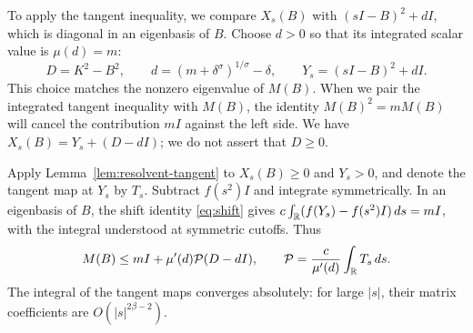 To apply the tangent inequality, we compare $X_s(B)$ with
$(sI-B)^2+dI$, which is diagonal in an eigenbasis of $B$.
Choose $d>0$ so that its integrated scalar value is $\mu(d)=m$:
\begin{equation}\label{eq:D-d-Y}
 D=K^2-B^2,\qquad
 d=(m+\delta^\sigma)^{1/\sigma}-\delta,\qquad
 Y_s=(sI-B)^2+dI.
\end{equation}
This choice matches the nonzero eigenvalue of $M(B)$.
When we pair the integrated tangent inequality with $M(B)$,
the identity $M(B)^2=mM(B)$ will cancel the contribution $mI$
against the left side.
We have $X_s(B)=Y_s+(D-dI)$; we do not assert that $D\ge0$.

Apply Lemma~\ref{lem:resolvent-tangent} to $X_s(B)\ge0$ and $Y_s>0$,
and denote the tangent map at $Y_s$ by $T_s$.
Subtract $f(s^2)I$ and integrate symmetrically.
In an eigenbasis of $B$, the shift identity \eqref{eq:shift} gives
$c\int_\mathbb R(f(Y_s)-f(s^2)I)\,ds=mI$, with the integral understood
at symmetric cutoffs. Thus
\begin{equation}\label{eq:M-tangent}
 M(B)\le mI+\mu'(d)\mathcal P(D-dI),
 \qquad \mathcal P=\frac{c}{\mu'(d)}\int_\mathbb R T_s\,ds.
\end{equation}
The integral of the tangent maps converges absolutely: for large $|s|$,
their matrix coefficients are $O(|s|^{2\beta-2})$.

